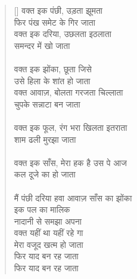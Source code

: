 \begin{verse}[\versewidth]\texthindi{
वक्त इक पंछी, उड़ता झूमता \\
फिर पंख समेट के गिर जाता\\
वक्त इक दरिया, उछलता इठलाता\\
समन्दर में खो जाता\\
\\
वक्त इक झोंका, छूता जिसे \\
उसे हिला के शांत हो जाता\\
वक्त आवाज़, बोलता गरजता चिल्लाता\\
चुपके सन्नाटा बन जाता\\
\\
वक्त इक फूल, रंग भरा खिलता इतराता\\
शाम ढली मुरझा जाता\\
\\
वक्त इक साँस, मेरा हक है उस पे आज\\
कल दूजे का हो जाता\\
\\
मैं पंछी दरिया हवा आवाज़ साँस का झोंका\\
इक पल का मालिक\\
नादानी से समझा अपना\\
वक्त यहीं था यहीं रहे गा\\
मेरा वजूद खत्म हो जाता\\
फिर याद बन रह जाता\\
फिर याद बन रह जाता
}
\end{verse}

